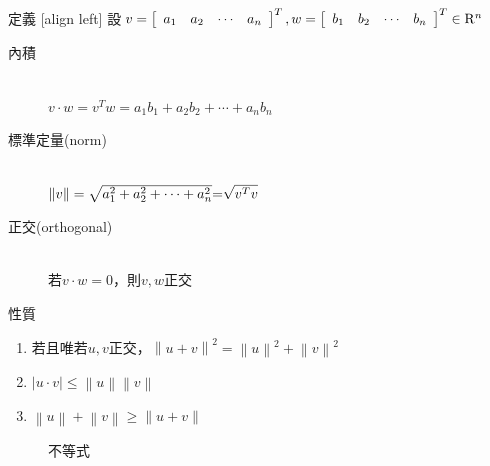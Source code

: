 \documentclass[14pt]{beamer}
\begin{document}
\begin{frame}[fragile]{定義}
		[align left]
	 {\small 設$v=\left[\begin{array}{cccc} {a_{1} } & {a_{2} } & {\cdots } & {a_{n} } \end{array}\right]^{T} ,w=\left[\begin{array}{cccc} {b_{1} } & {b_{2} } & {\cdots } & {b_{n} } \end{array}\right]^{T}\in {\rm R}^{n} $}\\
	\begin{description}
	  	\item[內積] \hfill \\$v\cdot w=v^{T} w=a_{1} b_{1} +a_{2} b_{2} +\cdots +a_{n} b_{n} $
	  	\item[標準定量(norm)] \hfill \\
	  	$\left\| v\right\| =\sqrt{a_{1}^{2} +a_{2}^{2} +\cdots +a_{n}^{2} } {\rm =}\sqrt{v^{T} v} $
	  	\item[正交(orthogonal)] \hfill \\
	  	若$v\cdot w=0$，則$v,w$正交
	\end{description}
\end{frame}
\begin{frame}[fragile]{性質}
  \begin{enumerate}
  	\item 若且唯若$u,v$正交，$\left\| u+v\right\| ^{2} =\left\| u\right\| ^{2} +\left\| v\right\| ^{2} $ 
  	\item $\left|u\cdot v\right|\le \left\| u\right\| \left\| v\right\| $
  	\item $\left\| u\right\| +\left\| v\right\| \ge \left\| u+v\right\| $
  \end{enumerate}
  \begin{figure}[H]
  	\centering
  	\caption{不等式}
  	\label{transformation}
  \end{figure}
\end{frame}
\end{document}
